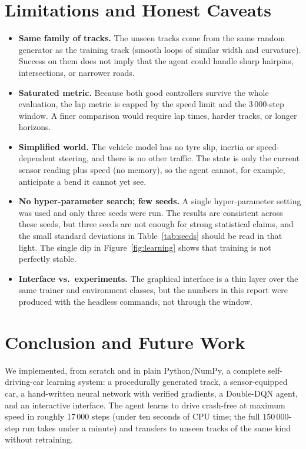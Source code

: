 \documentclass[11pt,a4paper]{article}
\begin{document}
\section{Limitations and Honest Caveats}
\begin{itemize}
  \item \textbf{Same family of tracks.} The unseen tracks come from the same random generator as the training track (smooth loops of similar width and curvature). Success on them does not imply that the agent could handle sharp hairpins, intersections, or narrower roads.
  \item \textbf{Saturated metric.} Because both good controllers survive the whole evaluation, the lap metric is capped by the speed limit and the 3\,000-step window. A finer comparison would require lap times, harder tracks, or longer horizons.
  \item \textbf{Simplified world.} The vehicle model has no tyre slip, inertia or speed-dependent steering, and there is no other traffic. The state is only the current sensor reading plus speed (no memory), so the agent cannot, for example, anticipate a bend it cannot yet see.
  \item \textbf{No hyper-parameter search; few seeds.} A single hyper-parameter setting was used and only three seeds were run. The results are consistent across these seeds, but three seeds are not enough for strong statistical claims, and the small standard deviations in Table~\ref{tab:seeds} should be read in that light. The single dip in Figure~\ref{fig:learning} shows that training is not perfectly stable.
  \item \textbf{Interface vs.\ experiments.} The graphical interface is a thin layer over the same trainer and environment classes, but the numbers in this report were produced with the headless commands, not through the window.
\end{itemize}

\section{Conclusion and Future Work}
We implemented, from scratch and in plain Python/NumPy, a complete self-driving-car learning system: a procedurally generated track, a sensor-equipped car, a hand-written neural network with verified gradients, a Double-DQN agent, and an interactive interface.
The agent learns to drive crash-free at maximum speed in roughly 17\,000 steps (under ten seconds of CPU time; the full 150\,000-step run takes under a minute) and transfers to unseen tracks of the same kind without retraining.
\end{document}
